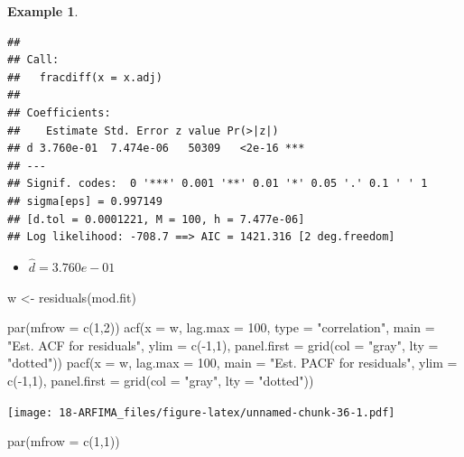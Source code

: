 \documentclass[
]{book}
\newenvironment{Shaded}{\begin{snugshade}}{\end{snugshade}}
\newcommand{\AttributeTok}[1]{\textcolor[rgb]{0.77,0.63,0.00}{#1}}
\newcommand{\DecValTok}[1]{\textcolor[rgb]{0.00,0.00,0.81}{#1}}
\newcommand{\FunctionTok}[1]{\textcolor[rgb]{0.00,0.00,0.00}{#1}}
\newcommand{\NormalTok}[1]{#1}
\newcommand{\OtherTok}[1]{\textcolor[rgb]{0.56,0.35,0.01}{#1}}
\newcommand{\SpecialCharTok}[1]{\textcolor[rgb]{0.00,0.00,0.00}{#1}}
\newcommand{\StringTok}[1]{\textcolor[rgb]{0.31,0.60,0.02}{#1}}
\providecommand{\tightlist}{%
  \setlength{\itemsep}{0pt}\setlength{\parskip}{0pt}}
\theoremstyle{definition}
\theoremstyle{definition}
\newtheorem{example}{Example}[chapter]
\theoremstyle{definition}
\theoremstyle{definition}
\theoremstyle{remark}
\begin{document}
\begin{example}
\begin{verbatim}
## 
## Call:
##   fracdiff(x = x.adj) 
## 
## Coefficients:
##    Estimate Std. Error z value Pr(>|z|)    
## d 3.760e-01  7.474e-06   50309   <2e-16 ***
## ---
## Signif. codes:  0 '***' 0.001 '**' 0.01 '*' 0.05 '.' 0.1 ' ' 1
## sigma[eps] = 0.997149 
## [d.tol = 0.0001221, M = 100, h = 7.477e-06]
## Log likelihood: -708.7 ==> AIC = 1421.316 [2 deg.freedom]
\end{verbatim}

\begin{itemize}
\tightlist
\item
  \(\hat d=3.760e-01\)
\end{itemize}

\begin{Shaded}
\begin{Highlighting}[]
\NormalTok{w }\OtherTok{\textless{}{-}} \FunctionTok{residuals}\NormalTok{(mod.fit)}

\FunctionTok{par}\NormalTok{(}\AttributeTok{mfrow =} \FunctionTok{c}\NormalTok{(}\DecValTok{1}\NormalTok{,}\DecValTok{2}\NormalTok{))}
\FunctionTok{acf}\NormalTok{(}\AttributeTok{x =}\NormalTok{ w, }\AttributeTok{lag.max =} \DecValTok{100}\NormalTok{, }\AttributeTok{type =} \StringTok{"correlation"}\NormalTok{, }\AttributeTok{main =} 
    \StringTok{"Est. ACF for residuals"}\NormalTok{, }\AttributeTok{ylim =} \FunctionTok{c}\NormalTok{(}\SpecialCharTok{{-}}\DecValTok{1}\NormalTok{,}\DecValTok{1}\NormalTok{), }
    \AttributeTok{panel.first =} \FunctionTok{grid}\NormalTok{(}\AttributeTok{col =} \StringTok{"gray"}\NormalTok{, }\AttributeTok{lty =} \StringTok{"dotted"}\NormalTok{))}
\FunctionTok{pacf}\NormalTok{(}\AttributeTok{x =}\NormalTok{ w, }\AttributeTok{lag.max =} \DecValTok{100}\NormalTok{, }\AttributeTok{main =} \StringTok{"Est. PACF for }
\StringTok{    residuals"}\NormalTok{, }\AttributeTok{ylim =} \FunctionTok{c}\NormalTok{(}\SpecialCharTok{{-}}\DecValTok{1}\NormalTok{,}\DecValTok{1}\NormalTok{), }\AttributeTok{panel.first =} \FunctionTok{grid}\NormalTok{(col }
    \OtherTok{=} \StringTok{"gray"}\NormalTok{, }\AttributeTok{lty =} \StringTok{"dotted"}\NormalTok{))}
\end{Highlighting}
\end{Shaded}

\texttt{[image: 18-ARFIMA\_files/figure-latex/unnamed-chunk-36-1.pdf]}

\begin{Shaded}
\begin{Highlighting}[]
\FunctionTok{par}\NormalTok{(}\AttributeTok{mfrow =} \FunctionTok{c}\NormalTok{(}\DecValTok{1}\NormalTok{,}\DecValTok{1}\NormalTok{))}
\end{Highlighting}
\end{Shaded}


\end{example}
\end{document}
